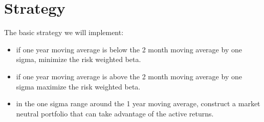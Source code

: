 \documentclass[10pt,letterpaper,oneside]{article}
\begin{document}
\section{Strategy}
The basic strategy we will implement:
\begin{itemize}
\item if one year moving average is below the 2 month moving average by one sigma, minimize the risk weighted beta. 
\item if one year moving average is above the 2 month moving average by one sigma maximize the risk weighted beta.
\item in the one sigma range around the 1 year moving average, construct a market neutral portfolio that can take advantage of the active returns.
\end{itemize}
\end{document}
